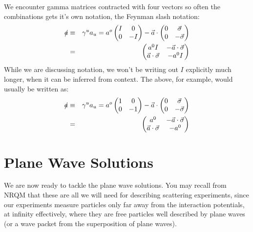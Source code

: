\documentclass[12pt]{book}
\begin{document}
We encounter gamma matrices contracted with four vectors so often the combinations gets it's own notation, the Feynman slash notation:
\begin{eqnarray*}
\slashed{a} &\equiv& \gamma^u a_u = a^o \begin{pmatrix} I & 0 \\ 0 & -I \end{pmatrix}
- \vec{a} \cdot \begin{pmatrix} 0 & \vec{\sigma} \\ 0 & -\vec{\sigma} \end{pmatrix}\\
&=& \begin{pmatrix} a^0 I & - \vec{a}\cdot\vec{\sigma} \\ \vec{a}\cdot\vec{\sigma} & -a^0 I \end{pmatrix}
\end{eqnarray*}
While we are discussing notation, we won't be writing out $I$ explicitly much longer, when it can be inferred from context.  The above, for example, would usually be written as:
\begin{eqnarray*}
\slashed{a} &\equiv& \gamma^u a_u = a^o \begin{pmatrix} 1 & 0 \\ 0 & -1 \end{pmatrix}
- \vec{a} \cdot \begin{pmatrix} 0 & \vec{\sigma} \\ 0 & -\vec{\sigma} \end{pmatrix}\\
&=& \begin{pmatrix} a^0 & - \vec{a}\cdot\vec{\sigma} \\ \vec{a}\cdot\vec{\sigma} & -a^0 \end{pmatrix}
\end{eqnarray*}

\section{Plane Wave Solutions}

We are now ready to tackle the plane wave solutions.  You may recall
from NRQM that these are all we will need for describing scattering
experiments, since our experiments measure particles only far away
from the interaction potentials, at infinity effectively, where they
are free particles well described by plane waves (or a wave packet
from the superposition of plane waves).
\end{document}
